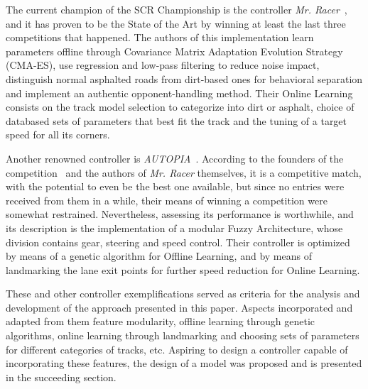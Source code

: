 	The current champion of the SCR Championship is the controller \emph{Mr. Racer}~\cite{MrRacer}, and it has
	proven to be the State of the Art by winning at least the last three competitions that happened. The authors
	of this implementation learn parameters offline through Covariance Matrix Adaptation Evolution Strategy
	(CMA-ES), use regression and low-pass filtering to reduce noise impact, distinguish normal asphalted roads
	from dirt-based ones for behavioral separation and implement an authentic opponent-handling method. Their
	Online Learning consists on the track model selection to categorize into dirt or asphalt, choice of databased
	sets of parameters that best fit the track and the tuning of a target speed for all its corners.
	
	Another renowned controller is \emph{AUTOPIA}~\cite{AUTOPIA}. According to the founders of the
	competition~\cite{SCRC} and the authors of \emph{Mr. Racer} themselves, it is a competitive match, with the
	potential to even be the best one available, but since no entries were received from them in a while, their
	means of winning a competition were somewhat restrained. Nevertheless, assessing its performance is
	worthwhile, and its description is the implementation of a modular Fuzzy Architecture, whose division contains
	gear, steering and speed control. Their controller is optimized by means of a genetic algorithm for Offline
	Learning, and by means of landmarking the lane exit points for further speed reduction for Online Learning.
	
	These and other controller exemplifications served as criteria for the analysis and development of the
	approach presented in this paper. Aspects incorporated and adapted from them feature modularity, offline learning
	through genetic algorithms, online learning through landmarking and choosing sets of parameters for different
	categories of tracks, etc. Aspiring to design a controller capable of incorporating these features, the design of
	a model was proposed and is presented in the succeeding section.
	